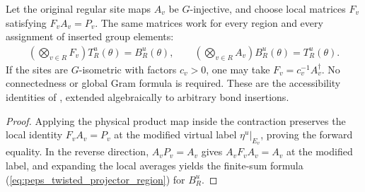 \begin{lemma}%
    \label{thm:peps_regular_twisted_region_accessibility}
    \leanok
    Let the original regular site maps $A_v$ be $G$-injective, and
    choose local matrices $F_v$ satisfying $F_vA_v=P_v$. The same
    matrices work for every region and every assignment of inserted
    group elements:
    \begin{align}
        \left(\bigotimes_{v\in R}F_v\right)T_R^u(\theta)=B_R^u(\theta),
        \qquad
        \left(\bigotimes_{v\in R}A_v\right)B_R^u(\theta)=T_R^u(\theta).
    \end{align}
    If the sites are $G$-isometric with factors $c_v>0$, one may take
    $F_v=c_v^{-1}A_v^\dagger$. No connectedness or global Gram formula
    is required. These are the accessibility identities of
    \cite[Observation after Lemma~6.3]{Schuch2010PEPS}, extended
    algebraically to arbitrary bond insertions.
\end{lemma}

\begin{proof}\leanok
    Applying the physical product map inside the contraction preserves
    the local identity $F_vA_v=P_v$ at the modified
    virtual label $\eta^u|_{E_v}$, proving the forward equality.
    In the reverse direction, $A_vP_v=A_v$ gives
    $A_vF_vA_v=A_v$ at the modified label, and expanding the local
    averages yields the finite-sum formula
    (\ref{eq:peps_twisted_projector_region}) for $B_R^u$.
\end{proof}

